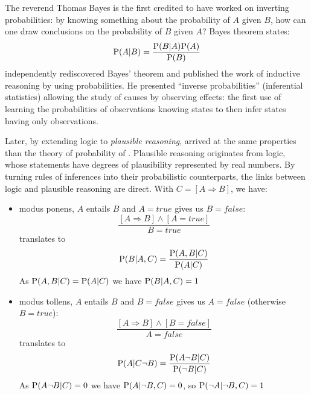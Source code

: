 The reverend Thomas Bayes is the first credited to have worked on inverting probabilities: by knowing something about the probability of $A$ given $B$, how can one draw conclusions on the probability of $B$ given $A$? Bayes theorem states: $$\mathrm{P}(A|B) = \frac{\mathrm{P}(B|A)\mathrm{P}(A)}{\mathrm{P}(B)}$$
\cite{Laplace} independently rediscovered Bayes' theorem and published the work of inductive reasoning by using probabilities. He presented ``inverse probabilities'' (inferential statistics) allowing the study of causes by observing effects: the first use of learning the probabilities of observations knowing states to then infer states having only observations.

Later, by extending logic to \textit{plausible reasoning}, \cite{Jaynes} arrived at the same properties than the theory of probability of \cite{Kolmogorov33}. Plausible reasoning originates from logic, whose statements have degrees of plausibility represented by real numbers. %
By turning rules of inferences into their probabilistic counterparts, the links between logic and plausible reasoning are direct. With $C=[A\Rightarrow B]$, we have:
\begin{itemize}
    \item modus ponens, $A$ entails $B$ and $A=true$ gives us $B=false$: $$\frac{[A\Rightarrow B] \wedge [A=true]}{B=true}$$ translates to $$\mathrm{P}(B|A,C)=\frac{\mathrm{P}(A,B|C)}{\mathrm{P}(A|C)}$$
As $\mathrm{P}(A,B|C) = \mathrm{P}(A|C)$ we have $\mathrm{P}(B|A,C)=1$
    \item modus tollens, $A$ entails $B$ and $B=false$ gives us $A=false$ (otherwise $B=true$): $$\frac{[A\Rightarrow B] \wedge [B=false]}{A=false}$$ translates to $$\mathrm{P}(A|C\neg B)=\frac{\mathrm{P}(A \neg B|C)}{\mathrm{P}(\neg B|C)}$$
As $\mathrm{P}(A\neg B | C) = 0$ we have $\mathrm{P}(A|\neg B, C) =0$, so $\mathrm{P}(\neg A| \neg B, C)=1$
    
\end{itemize}
